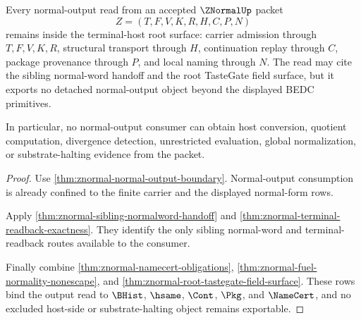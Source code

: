 \begin{theorem}
\label{thm:znormal-normal-output-root-nonescape}
Every normal-output read from an accepted $\ZNormalUp$ packet
$$
Z=(T,F,V,K,R,H,C,P,N)
$$
remains inside the terminal-host root surface: carrier admission through $T,F,V,K,R$, structural transport through $H$, continuation replay through $C$, package provenance through $P$, and local naming through $N$. The read may cite the sibling normal-word handoff and the root TasteGate field surface, but it exports no detached normal-output object beyond the displayed BEDC primitives.

In particular, no normal-output consumer can obtain host conversion, quotient computation, divergence detection, unrestricted evaluation, global normalization, or substrate-halting evidence from the packet.
\end{theorem}
\begin{proof}
Use \autoref{thm:znormal-normal-output-boundary}. Normal-output consumption is already confined to the finite carrier and the displayed normal-form rows.

Apply \autoref{thm:znormal-sibling-normalword-handoff} and \autoref{thm:znormal-terminal-readback-exactness}. They identify the only sibling normal-word and terminal-readback routes available to the consumer.

Finally combine \autoref{thm:znormal-namecert-obligations}, \autoref{thm:znormal-fuel-normality-nonescape}, and \autoref{thm:znormal-root-tastegate-field-surface}. These rows bind the output read to $\BHist$, $\hsame$, $\Cont$, $\Pkg$, and $\NameCert$, and no excluded host-side or substrate-halting object remains exportable.
\end{proof}
